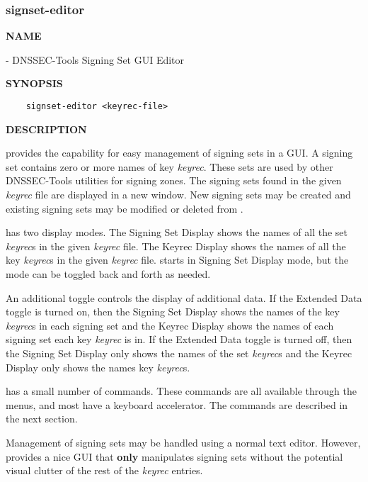 \clearpage

\subsubsection{\bf signset-editor}

{\bf NAME}

 - DNSSEC-Tools Signing Set GUI Editor

{\bf SYNOPSIS}

\begin{verbatim}
    signset-editor <keyrec-file>
\end{verbatim}

{\bf DESCRIPTION}

 provides the capability for easy management of signing
sets in a GUI.  A signing set contains zero or more names of key {\it keyrec}.
These sets are used by other DNSSEC-Tools utilities for signing zones.  The
signing sets found in the given {\it keyrec} file are displayed in a new
window.  New signing sets may be created and existing signing sets may be
modified or deleted from .

 has two display modes.  The Signing Set Display shows the
names of all the set {\it keyrec}s in the given {\it keyrec} file.  The Keyrec
Display shows the names of all the key {\it keyrec}s in the given {\it keyrec}
file.   starts in Signing Set Display mode, but the mode
can be toggled back and forth as needed.

An additional toggle controls the display of additional data.  If the Extended
Data toggle is turned on, then the Signing Set Display shows the names of the
key {\it keyrec}s in each signing set and the Keyrec Display shows the names
of each signing set each key {\it keyrec} is in.  If the Extended Data toggle
is turned off, then the Signing Set Display only shows the names of the set
{\it keyrec}s and the Keyrec Display only shows the names key {\it keyrec}s.

 has a small number of commands.  These commands are all
available through the menus, and most have a keyboard accelerator.  The
commands are described in the next section.

Management of signing sets may be handled using a normal text editor.
However,  provides a nice GUI that {\bf only} manipulates
signing sets without the potential visual clutter of the rest of the
{\it keyrec} entries.

